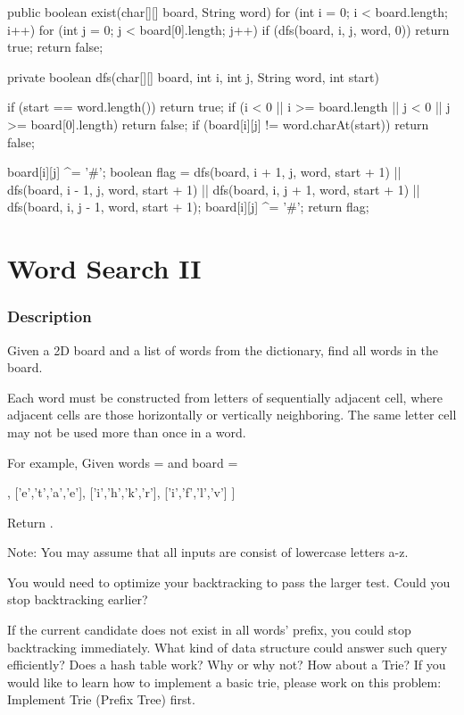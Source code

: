 \begin{Code}
public boolean exist(char[][] board, String word) {
    for (int i = 0; i < board.length; i++) {
        for (int j = 0; j < board[0].length; j++) {
            if (dfs(board, i, j, word, 0)) {
                return true;
            }
        }
    }
    return false;
}

private boolean dfs(char[][] board, int i, int j, String word, int start) {
    if (start == word.length()) {
        return true;
    }
    if (i < 0 || i >= board.length || j < 0 || j >= board[0].length) {
        return false;
    }
    if (board[i][j] != word.charAt(start)) {
        return false;
    }

    board[i][j] ^= '#';
    boolean flag = dfs(board, i + 1, j, word, start + 1)
            || dfs(board, i - 1, j, word, start + 1)
            || dfs(board, i, j + 1, word, start + 1)
            || dfs(board, i, j - 1, word, start + 1);
    board[i][j] ^= '#';
    return flag;
}
\end{Code}

\newpage

\section{Word Search II} %

\subsubsection{Description}
Given a 2D board and a list of words from the dictionary, find all words in the board.

Each word must be constructed from letters of sequentially adjacent cell, where adjacent cells are those horizontally or vertically neighboring. The same letter cell may not be used more than once in a word.

For example,
Given words =  and board =
\begin{Code}
[
  ['o','a','a','n'],
  ['e','t','a','e'],
  ['i','h','k','r'],
  ['i','f','l','v']
]
\end{Code}
Return .

Note:
You may assume that all inputs are consist of lowercase letters a-z.

You would need to optimize your backtracking to pass the larger test. Could you stop backtracking earlier?

If the current candidate does not exist in all words' prefix, you could stop backtracking immediately. What kind of data structure could answer such query efficiently? Does a hash table work? Why or why not? How about a Trie? If you would like to learn how to implement a basic trie, please work on this problem: Implement Trie (Prefix Tree) first.

